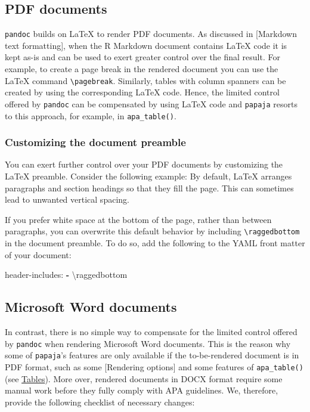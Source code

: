 \documentclass[man,floatsintext]{apa6}
\newenvironment{Shaded}{\begin{snugshade}}{\end{snugshade}}
\newcommand{\KeywordTok}[1]{\textcolor[rgb]{0.13,0.29,0.53}{\textbf{#1}}}
\newcommand{\FunctionTok}[1]{\textcolor[rgb]{0.00,0.00,0.00}{#1}}
\newcommand{\NormalTok}[1]{#1}
\theoremstyle{definition}
\theoremstyle{definition}
\theoremstyle{definition}
\theoremstyle{remark}
\begin{document}
\subsection{PDF documents}\label{pdf-documents}

\texttt{pandoc} builds on LaTeX to render PDF documents. As discussed in
{[}Markdown text formatting{]}, when the R Markdown document contains
LaTeX code it is kept as-is and can be used to exert greater control
over the final result. For example, to create a page break in the
rendered document you can use the LaTeX command
\texttt{\textbackslash{}pagebreak}. Similarly, tables with column
spanners can be created by using the corresponding LaTeX code. Hence,
the limited control offered by \texttt{pandoc} can be compensated by
using LaTeX code and \texttt{papaja} resorts to this approach, for
example, in \texttt{apa\_table()}.

\subsubsection{Customizing the document
preamble}\label{customizing-the-document-preamble}

You can exert further control over your PDF documents by customizing the
LaTeX preamble. Consider the following example: By default, LaTeX
arranges paragraphs and section headings so that they fill the page.
This can sometimes lead to unwanted vertical spacing.

If you prefer white space at the bottom of the page, rather than between
paragraphs, you can overwrite this default behavior by including
\texttt{\textbackslash{}raggedbottom} in the document preamble. To do
so, add the following to the YAML front matter of your document:

\begin{Shaded}
\begin{Highlighting}[]
\FunctionTok{header-includes:}
  \KeywordTok{-}\NormalTok{ \textbackslash{}raggedbottom}
\end{Highlighting}
\end{Shaded}

\subsection{Microsoft Word documents}\label{microsoft-word-documents}

In contrast, there is no simple way to compensate for the limited
control offered by \texttt{pandoc} when rendering Microsoft Word
documents. This is the reason why some of \texttt{papaja}'s features are
only available if the to-be-rendered document is in PDF format, such as
some {[}Rendering options{]} and some features of \texttt{apa\_table()}
(see \protect\hyperlink{tables}{Tables}). More over, rendered documents
in DOCX format require some manual work before they fully comply with
APA guidelines. We, therefore, provide the following checklist of
necessary changes:
\end{document}

